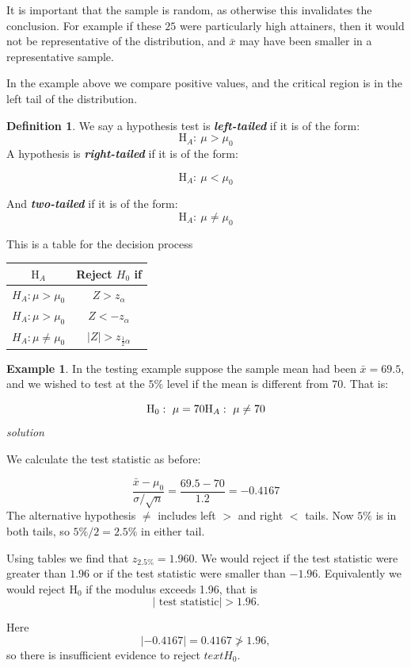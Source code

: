 \documentclass[
]{book}
\theoremstyle{definition}
\newtheorem{definition}{Definition}[chapter]
\theoremstyle{definition}
\newtheorem{example}{Example}[chapter]
\theoremstyle{definition}
\theoremstyle{definition}
\theoremstyle{remark}
\begin{document}
It is important that the sample is random, as otherwise this invalidates the conclusion. For example if these \(25\) were particularly high attainers, then it would not be representative of the distribution, and \(\bar{x}\) may have been smaller in a representative sample.

In the example above we compare positive values, and the critical region is in the left tail of the distribution.

\begin{definition}
We say a hypothesis test is \textbf{\emph{left-tailed}} if it is of the form:
\[\text{H}_A: \ \mu > \mu_0\]
A hypothesis is \textbf{\emph{right-tailed}} if it is of the form:

\[\text{H}_A: \ \mu < \mu_0\]

And \textbf{\emph{two-tailed}} if it is of the form:
\[\text{H}_A: \ \mu \neq \mu_0\]
\end{definition}

This is a table for the decision process

\begin{longtable}[]{@{}cc@{}}
\toprule
\(\text{H}_{A}\) & Reject \(H_{0}\) if\tabularnewline
\midrule
\endhead
\(H_{A}: \mu > \mu_0\) & \(Z>z_{\alpha}\)\tabularnewline
\(H_{A}: \mu > \mu_0\) & \(Z<-z_{\alpha}\)\tabularnewline
\(H_{A}: \mu \neq \mu_0\) & \(|Z|>z_{\frac{1}{2}\alpha}\)\tabularnewline
\bottomrule
\end{longtable}

\begin{example}
In the testing example suppose the sample mean had been \(\bar{x}=69.5\), and we wished to test at the \(5\%\) level if the mean is different from \(70\). That is:

\[\text{H}_0: \ \mu = 70 \\  \text{H}_A: \ \mu \neq 70\]
\emph{solution}

We calculate the test statistic as before:

\[\frac{\bar{x}-\mu_0}{\sigma / \sqrt{n}} =\frac{69.5-70}{1.2}=-0.4167  \]
The alternative hypothesis \(\neq\) includes left \(>\) and right \(<\) tails. Now \(5\%\) is in both tails, so \(5\% / 2 =2.5\%\) in either tail.

Using tables we find that \(z_{2.5\%} = 1.960\). We would reject if the test statistic were greater than \(1.96\) or if the test statistic were smaller than \(-1.96\). Equivalently we would reject \(\text{H}_0\) if the modulus exceeds 1.96, that is \[|\text{ test statistic}|>1.96.\]

Here
\[|-0.4167| = 0.4167 \ngtr 1.96,\]
so there is insufficient evidence to reject \(text{H}_0\).
\end{example}
\end{document}
